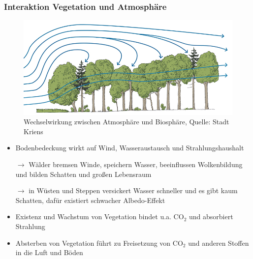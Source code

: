 \begin{frame}
	\frametitle{Interaktion Vegetation und Atmosphäre}

  \begin{figure}
    \centering
    \includegraphics[width=.55\linewidth]{bilder/Wind_Vegetation.jpg}
    \caption{Wechselwirkung zwischen Atmosphäre und Biosphäre, Quelle: Stadt Kriens}
  \end{figure}
		\begin{itemize}
			\item Bodenbedeckung wirkt auf Wind, Wasseraustausch und Strahlungshaushalt
			\item [$\rightarrow$] Wälder bremsen Winde, speichern Wasser, beeinflussen Wolkenbildung und bilden Schatten und großen Lebensraum
			\item [$\rightarrow$] in Wüsten und Steppen versickert Wasser schneller und es gibt kaum Schatten, dafür existiert schwacher Albedo-Effekt
			\item Existenz und Wachstum von Vegetation bindet u.a. CO$_2$ und absorbiert Strahlung
			\item Absterben von Vegetation führt zu Freisetzung von CO$_2$ und anderen Stoffen in die Luft und Böden %
		\end{itemize}

\end{frame}

%
%
